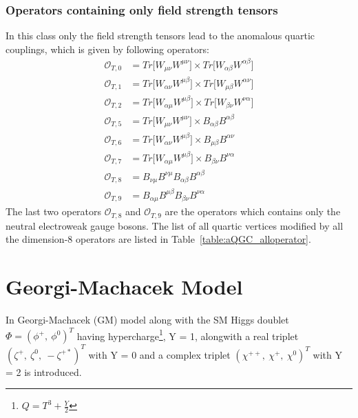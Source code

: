 \subsubsection{Operators containing only field strength tensors} %
\label{ssub:operators_containing_only_field_strength_tensors}
In this class only the field strength tensors lead to the anomalous quartic couplings, which is given by following operators:
\begin{align}
    \mathcal{O}_{T,0} &=Tr\Big[W_{\mu\nu}W^{\mu\nu}\Big]\times Tr\Big[W_{\alpha\beta}W^{\alpha\beta}\Big]\\
    \mathcal{O}_{T,1} &=Tr\Big[W_{\alpha\nu}W^{\mu\beta}\Big]\times Tr\Big[W_{\mu\beta}W^{\alpha\nu}\Big]\\
    \mathcal{O}_{T,2} &=Tr\Big[W_{\alpha\mu}W^{\mu\beta}\Big]\times Tr\Big[W_{\beta\nu}W^{\nu\alpha}\Big]\\
    \mathcal{O}_{T,5} &=Tr\Big[W_{\mu\nu}W^{\mu\nu}\Big]\times B_{\alpha\beta}B^{\alpha\beta}\\
    \mathcal{O}_{T,6} &=Tr\Big[W_{\alpha\nu}W^{\mu\beta}\Big]\times B_{\mu\beta}B^{\alpha\nu}\\
    \mathcal{O}_{T,7} &=Tr\Big[W_{\alpha\mu}W^{\mu\beta}\Big]\times B_{\beta\nu}B^{\nu\alpha}\\
    \mathcal{O}_{T,8} &=B_{\nu\mu}B^{\nu\mu}B_{\alpha\beta}B^{\alpha\beta}\\
    \mathcal{O}_{T,9} &=B_{\alpha\mu}B^{\mu\beta}B_{\beta\nu}B^{\nu\alpha}
\end{align}
The last two operators $\mathcal{O}_{T,8}$ and $\mathcal{O}_{T,9}$ are the operators which contains only the neutral electroweak gauge bosons.
The list of all quartic vertices modified by all the dimension-8 operators are listed in Table~\ref{table:aQGC_alloperator}.






\section{Georgi-Machacek Model} %
\label{sec:georgi_machacek_model}
In Georgi-Machacek (GM) model along with the SM Higgs doublet $\Phi = (\phi^+,~\phi^0)^T$ having hypercharge\footnote{$Q = T^3 + \frac{Y}{2}$}, Y = 1, alongwith a real triplet $(\zeta^+,~\zeta^0,~-\zeta^{+*})^T$ with Y = 0 and a complex triplet $(\chi^{++},~\chi^+,~\chi^0)^T$ with Y = 2 is introduced.

